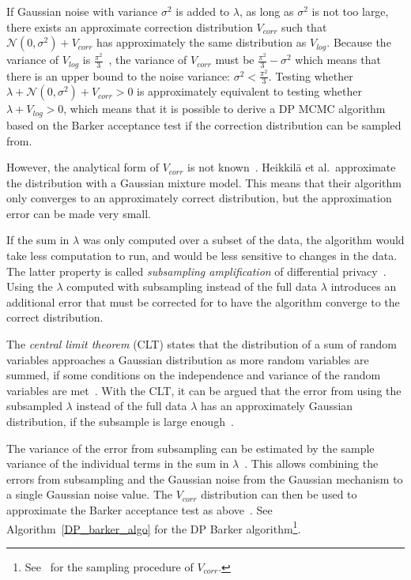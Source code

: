 \documentclass[english,twoside,openright]{HYgraduMLDS}
\newcommand{\caln}{{\mathcal{N}}}
\begin{document}
If Gaussian noise with variance \(\sigma^2\) is added to 
\(\lambda\), as long as \(\sigma^{2}\) is not too large, there exists an
approximate correction
distribution \(V_{corr}\) such that \(\caln(0, \sigma^2) + V_{corr}\) has
approximately the same distribution as \(V_{log}\). Because the variance of
\(V_{log}\) is
\(\frac{\pi^2}{3}\)~\cite{HeikkilaJDH19}, the variance of \(V_{corr}\) must be 
\(\frac{\pi^2}{3} - \sigma^2\) which means that there is an upper bound
to the noise variance: \(\sigma^2 < \frac{\pi^2}{3}\). Testing whether 
\(\lambda + \caln(0, \sigma^2) + V_{corr} > 0\) is approximately equivalent
to testing 
whether \(\lambda + V_{log} > 0\), which means that it is possible to derive 
a DP MCMC algorithm based on the Barker acceptance test if the correction 
distribution can be sampled from.

However, the analytical form of \(V_{corr}\) is not known~\cite{HeikkilaJDH19}.
Heikkilä et al.\  approximate the distribution with a Gaussian mixture model.
This means that their 
algorithm only converges to an approximately correct distribution, but the 
approximation error can be made very small.

If the sum in \(\lambda\) was only computed over a subset of the data, the 
algorithm would take less computation to run, and would be less sensitive 
to changes in the data. The latter property is called \emph{subsampling amplification}
of differential privacy~\cite{WangBK19}. Using the \(\lambda\) computed 
with subsampling instead of the full data \(\lambda\) introduces an additional 
error that must be corrected for to have the algorithm converge to the correct 
distribution. 

The \emph{central limit theorem} (CLT) states that the distribution of a sum 
of random variables approaches a Gaussian distribution as more random variables 
are summed, if some conditions on the independence and variance of the random 
variables are met~\cite{SPC17}. With the CLT, it can be argued
that the error from 
using the subsampled \(\lambda\) instead of the full data \(\lambda\) has an 
approximately Gaussian distribution, if the subsample is large 
enough~\cite{SPC17}.

The variance of the error from subsampling can 
be estimated by the sample variance of the individual terms in the sum in 
\(\lambda\)~\cite{SPC17}. This allows combining the errors from subsampling and the
Gaussian noise from the Gaussian mechanism to a single Gaussian noise value.
The \(V_{corr}\) distribution can then be used to approximate the Barker acceptance 
test as above~\cite{HeikkilaJDH19}. See Algorithm~\ref{DP_barker_algo} for the DP Barker
algorithm\footnote{
    See~\cite{HeikkilaJDH19} for the sampling procedure of \(V_{corr}\).
}.
\end{document}
